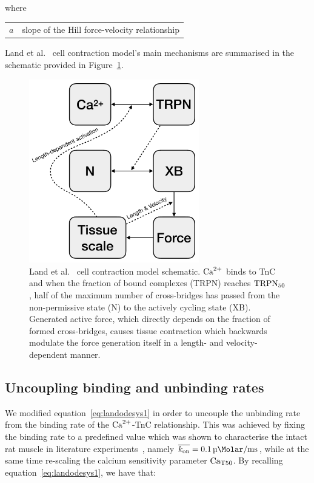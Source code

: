 \noindent
where

\vspace{0.2cm}
\begin{tabular}{ll}
    $a$ & slope of the Hill force-velocity relationship
\end{tabular}

\vspace{0.3cm}\noindent
Land et al.~\cite{Land:2012} cell contraction model's main mechanisms are summarised in the schematic provided in Figure~\ref{fig:cellcontrschematic}.

\begin{figure}[!ht]
    \myfloatalign
    \includegraphics[width=0.66\textwidth]{figures/chapter02/cellular_contraction_land.pdf}
    \caption{Land et al.~\cite{Land:2012} cell contraction model schematic. $\textrm{Ca}^{2+}$ binds to TnC and when the fraction of bound complexes (TRPN) reaches $\textrm{TRPN}_{50}$, half of the maximum number of cross-bridges has passed from the non-permissive state (N) to the actively cycling state (XB). Generated active force, which directly depends on the fraction of formed cross-bridges, causes tissue contraction which backwards modulate the force generation itself in a length- and velocity- dependent manner.}
    \label{fig:cellcontrschematic}
\end{figure}


%
%
%
\subsection{Uncoupling binding and unbinding rates}
We modified equation~\eqref{eq:landodesys1} in order to uncouple the unbinding rate from the binding rate of the $\textrm{Ca}^{2+}$-TnC relationship. This was achieved by fixing the binding rate to a predefined value which was shown to characterise the intact rat muscle in literature experiments~\cite{Niederer:2006}, namely $\overline{\kon}=\SI{0.1}{\micro\Molar\per\milli\second}$, while at the same time re-scaling the calcium sensitivity parameter $\textrm{Ca}_{\textrm{T}50}$. By recalling equation~\eqref{eq:landodesys1}, we have that:

